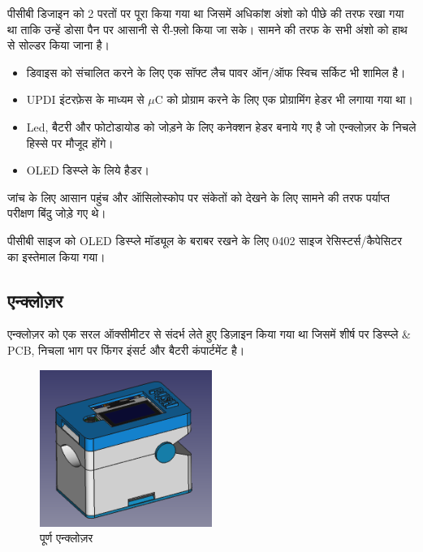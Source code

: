 		पीसीबी डिजाइन को 2 परतों पर पूरा किया गया था जिसमें अधिकांश अंशो को पीछे की तरफ रखा गया था ताकि उन्हें डोसा पैन पर आसानी से री-फ़्लो किया जा सके। सामने की तरफ के सभी अंशो को हाथ से सोल्डर किया जाना है। 

		\begin{itemize}
			
			\item डिवाइस को संचालित करने के लिए एक सॉफ्ट लैच पावर ऑन/ऑफ स्विच सर्किट भी शामिल है।
			
			\item UPDI इंटरफ़ेस के माध्यम से $\mu$C को प्रोग्राम करने के लिए एक प्रोग्रामिंग हेडर भी लगाया गया था।
			
			\item Led, बैटरी और फोटोडायोड को जोड़ने के लिए कनेक्शन हेडर बनाये गए है जो एन्क्लोज़र के निचले हिस्से पर मौजूद होंगे।
			
			\item OLED डिस्प्ले के लिये हैडर। 

		\end{itemize}
	
		जांच के लिए आसान पहुंच और ऑसिलोस्कोप पर संकेतों को देखने के लिए सामने की तरफ पर्याप्त परीक्षण बिंदु जोड़े गए थे।
		
		पीसीबी साइज को OLED डिस्प्ले मॉड्यूल के बराबर रखने के लिए 0402 साइज रेसिस्टर्स/कैपेसिटर का इस्तेमाल किया गया।
					

	\subsection{एन्क्लोज़र}		
		
		एन्क्लोज़र को एक सरल ऑक्सीमीटर से संदर्भ लेते हुए डिज़ाइन किया गया था जिसमें शीर्ष पर डिस्प्ले \& PCB, निचला भाग पर फिंगर इंसर्ट और बैटरी कंपार्टमेंट है।
		
		\begin{figure}[ht!]
			\centering
			\includegraphics[width=0.5\textwidth]{../common/enc/enc.png}
			\caption{पूर्ण एन्क्लोज़र}
		\end{figure}	
				
